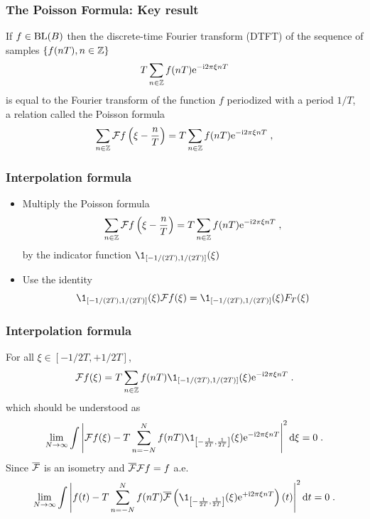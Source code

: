 \begin{frame}
\frametitle{The Poisson Formula: Key result}
If $f \in \mathrm{BL}(B)$ then the \alert{discrete-time Fourier transform} (DTFT) of the sequence of samples $\{ f(nT), n \in \mathbb{Z} \}$
\[
T \sum_{n \in \mathbb{Z}} f(nT) \mathrm{e}^{- \mathrm{i} 2 \pi \xi n T}
\]
is equal to the Fourier transform of the function $f$ periodized with a period $1/T$, a relation called the \alert{Poisson formula}
\begin{equation*}
\label{eq:FormuleSommatoirePoisson}
\sum_{n \in \mathbb{Z}} \mathcal{F} f \left( \xi - \frac{n}{T} \right)  = T \sum_{n \in \mathbb{Z}} f(nT) \mathrm{e}^{- \mathrm{i} 2 \pi \xi n T}\;,
\end{equation*}
\end{frame}

\begin{frame}
\frametitle{Interpolation formula}
\begin{itemize}
\item \alert<1>{Multiply the Poisson formula
\begin{equation*}
\sum_{n \in \mathbb{Z}} \mathcal{F} f \left( \xi - \frac{n}{T} \right)  = T \sum_{n \in \mathbb{Z}} f(nT) \mathrm{e}^{- \mathrm{i} 2 \pi \xi n T}\;,
\end{equation*}
by the indicator function $\1_{[-1/(2T),1/(2T)]}(\xi)$}
\item \alert<2>{Use the identity $$\1_{[-1/(2T),1/(2T)]}(\xi) \TF f (\xi)= \1_{[-1/(2T),1/(2T)]}(\xi) F_T(\xi)$$}
\end{itemize}

\end{frame}

\begin{frame}
\frametitle{Interpolation formula}
For all $\xi \in [-1/2T,+1/2T]$,
$$
\TF f (\xi) = T \sum_{n \in \zset} f(nT) \1_{[-1/(2T),1/(2T)]}(\xi) \rme^{- \rmi 2 \pi \xi n T} \eqsp.
$$
which should be understood as
$$
\lim_{N \to \infty} \int \left| \TF f(\xi)  - T \sum_{n =-N}^N f(nT) \1_{\left[-\frac{1}{2T},\frac{1}{2T}\right]}(\xi) \rme^{- \rmi 2 \pi
    \xi n T}  \right|^2 \rmd \xi = 0 \eqsp.
$$
Since $\overline{\mathcal{F}}$ is an isometry and $\overline{\mathcal{F}} \mathcal{F} f = f$ a.e.
$$
\lim_{N \to \infty} \int \left| f(t)  - T \sum_{n =-N}^N f(nT) \TFAC{\1_{\left[-\frac{1}{2T},\frac{1}{2T}\right]}(\xi) \rme^{+ \rmi 2 \pi
    \xi n T}}(t) \right|^2 \rmd t = 0 \eqsp.
$$
\end{frame}

